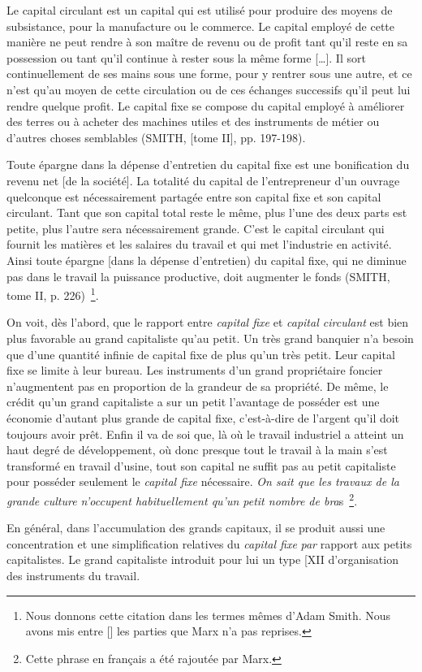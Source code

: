 \documentclass[french,twoside]{book} %
\newcommand\foreign[1]{\emph{#1}}
\newenvironment{quoteblock}%
  {\begin{quoting}}
  {\end{quoting}}
\newenvironment{quotebar}{%
    \def\FrameCommand{{\color{rubric!10!}\vrule width 0.5em} \hspace{0.9em}}%
    \def\OuterFrameSep{\itemsep} %
    \MakeFramed {\advance\hsize-\width \FrameRestore}
  }%
  {%
    \endMakeFramed
  }
\renewenvironment{quoteblock}%
  {%
    \savenotes
    \setstretch{0.9}
    \normalfont
    \begin{quotebar}
  }
  {%
    \end{quotebar}
    \spewnotes
  }
\begin{document}
\begin{quoteblock}
 \noindent Le capital circulant est un capital qui est utilisé pour produire des moyens de subsistance, pour la manufacture ou le commerce. Le capital employé de cette manière ne peut rendre à son maître de revenu ou de profit tant qu’il reste en sa possession ou tant qu’il continue à rester sous la même forme […]. Il sort continuellement de ses mains sous une forme, pour y rentrer sous une autre, et ce n’est qu’au moyen de cette circulation ou de ces échanges successifs qu’il peut lui rendre quelque profit. Le capital fixe se compose du capital employé à améliorer des terres ou à acheter des machines utiles et des instruments de métier ou d’autres choses semblables (SMITH, [tome II], pp. 197-198).\par
 Toute épargne dans la dépense d’entretien du capital fixe est une bonification du revenu net [de la société]. La totalité du capital de l’entrepreneur d’un ouvrage quelconque est nécessairement partagée entre son capital fixe et son capital circulant. Tant que son capital total reste le même, plus l’une des deux parts est petite, plus l’autre sera nécessairement grande. C’est le capital circulant qui fournit les matières et les salaires du travail et qui met l’industrie en activité. Ainsi toute épargne [dans la dépense d’entretien) du capital fixe, qui ne diminue pas dans le travail la puissance productive, doit augmenter le fonds (SMITH, tome II, p. 226) \footnote{Nous donnons cette citation dans les termes mêmes d’Adam Smith. Nous avons mis entre [] les parties que Marx n’a pas reprises.}.
 \end{quoteblock}

\noindent On voit, dès l’abord, que le rapport entre \foreign{capital fixe} et \foreign{capital circulant} est bien plus favorable au grand capitaliste qu’au petit. Un très grand banquier n’a besoin que d’une quantité infinie de capital fixe de plus qu’un très petit. Leur capital fixe se limite à leur bureau. Les instruments d’un grand propriétaire foncier n’augmentent pas en proportion de la grandeur de sa propriété. De même, le crédit qu’un grand capitaliste a sur un petit l’avantage de posséder est une économie d’autant plus grande de capital fixe, c’est-à-dire de l’argent qu’il doit toujours avoir prêt. Enfin il va de soi que, là où le travail industriel a atteint un haut degré de développement, où donc presque tout le travail à la main s’est transformé en travail d’usine, tout son capital ne suffit pas au petit capitaliste pour posséder seulement le \foreign{capital fixe} nécessaire. \emph{On sait que les travaux de la grande culture n’occupent habituellement qu’un petit nombre de bra}s \footnote{Cette phrase en français a été rajoutée par Marx.}.\par
En général, dans l’accumulation des grands capitaux, il se produit aussi une concentration et une simplification relatives du \foreign{capital fixe}\emph{ par} rapport aux petits capitalistes. Le grand capitaliste introduit pour lui un type [XII d’organisation des instruments du travail.\par
\end{document}
